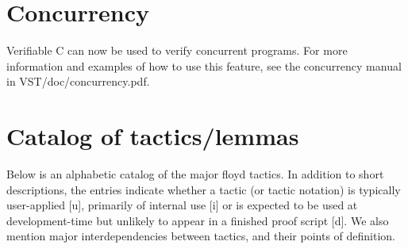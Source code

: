\documentclass[12pt,fleqn,openany,oneside,showtrims]{memoir}
\begin{document}
\chapter{Concurrency}
\label{refcard:concurrency}
Verifiable C can now be used to verify concurrent programs. For more information and examples of how to use this feature, see the concurrency manual in VST/doc/concurrency.pdf.

\chapter{Catalog of tactics/lemmas}
Below is an alphabetic catalog of the major floyd tactics. In addition
to short descriptions, the entries indicate whether a tactic (or
tactic notation) is typically user-applied [u], primarily of
internal use [i] or is expected to be used at development-time
but unlikely to appear in a finished proof script [d]. We also
mention major interdependencies between tactics, and their points of
definition.
\end{document}
